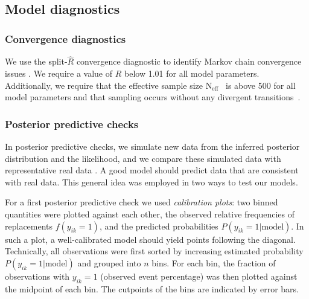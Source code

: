 \documentclass{bioinfo}
\begin{document}
\begin{methods}
\subsection{Model diagnostics}

\subsubsection{Convergence diagnostics}
We use the split-\(\hat{R}\) convergence diagnostic to identify Markov chain convergence issues \citep{Gelman1992, gelman2013bayesian}. We require a value of \(\hat{R}\) below 1.01 for all model parameters. Additionally, we require that the effective sample size \(\text{N}_{\text{eff}}\)~\citep{Stan2021} is above 500 for all model parameters and that sampling occurs without any divergent transitions~\citep{Betancourt2017a}.

\subsubsection{Posterior predictive checks}

In posterior predictive checks, we simulate new data from the inferred posterior distribution and the likelihood, and we compare these simulated data with representative real data \citep{Gabry2019}. A good model should predict data that are consistent with real data. This general idea was employed in two ways to test our models.

For a first posterior predictive check we used \emph{calibration plots}: two binned quantities were plotted against each other, the observed relative frequencies of replacements $f(y_{ik}=1)$, and the predicted probabilities $P(y_{ik}=1|\text{model})$. In such a plot, a well-calibrated model should yield points following the diagonal. Technically, all observations were first sorted by increasing estimated probability $P(y_{ik}=1|\text{model})$ and grouped into $n$ bins. For each bin, the fraction of observations with $y_{ik}=1$ (observed event percentage) was then plotted against the midpoint of each bin. The cutpoints of the bins are indicated by error bars.


\end{methods}
\end{document}
